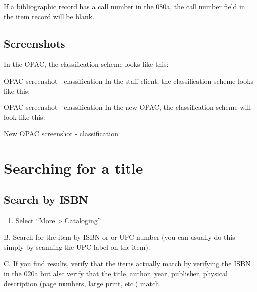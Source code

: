 \documentclass[letterpaper,10pt,english]{sphinxmanual}
\begin{document}
If a bibliographic record has a call number in the
080a,
the call number field in the item record will be blank.


\section{Screenshots}
\label{\detokenize{classification:screenshots}}
In the OPAC, the classification scheme looks like this:

\noindent{}

OPAC screenshot - classification
In the staff client, the classification scheme looks like this:

\noindent{}

OPAC screenshot - classification
In the new OPAC, the classification scheme will look like this:

\noindent{}

New OPAC screenshot - classification


\chapter{Searching for a title}
\label{\detokenize{searching-for-a-title:searching-for-a-title}}\label{\detokenize{searching-for-a-title::doc}}

\section{Search by ISBN}
\label{\detokenize{searching-for-a-title:search-by-isbn}}\begin{enumerate}
\item {} 
Select “More \textgreater{} Cataloging”

\end{enumerate}

\noindent{}

B. Search for the item by ISBN or or UPC number (you can usually do this
simply by scanning the UPC label on the item).

\noindent{}

C. If you find results, verify that the items actually match by
verifying the ISBN in the
020a but also verify that the
title, author, year, publisher, physical description (page numbers,
large print, etc.) match.
\end{document}
